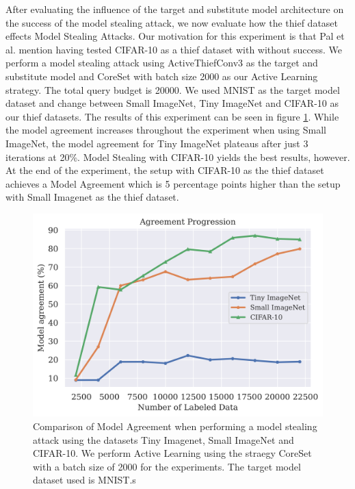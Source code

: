After evaluating the influence of the target and substitute model architecture on the success of the model stealing attack, we now evaluate how the thief dataset effects Model Stealing Attacks. Our motivation for this experiment is that Pal et al. 
mention having tested CIFAR-10 as a thief dataset with without success. We perform a model stealing attack using ActiveThiefConv3 as the target and substitute model and CoreSet with batch size 2000 as our Active Learning strategy. The total query budget
is 20000. We used MNIST as the target model dataset and change between Small ImageNet, Tiny ImageNet and CIFAR-10 as our thief datasets. The results of this experiment can be seen in figure \ref{fig:Evaluation:Results:CAL:EffectDataset}. While the model agreement 
increases throughout the experiment when using Small ImageNet, the model agreement for Tiny ImageNet plateaus after just 3 iterations at 20\%. Model Stealing with CIFAR-10 yields the best results, however. At the end of the experiment, the setup with CIFAR-10 as 
the thief dataset achieves a Model Agreement which is 5 percentage points higher than the setup with Small Imagenet as the thief dataset. \par

\begin{figure}[h]
    \centering
    \includegraphics[width=0.8\linewidth]{images/results_CALMS/effect_dataset.png}
    \caption[Effect of Thief Dataset choice on the success of Model Stealing Attacks]{Comparison of Model Agreement when performing a model stealing attack using the datasets Tiny Imagenet, Small ImageNet and CIFAR-10. We perform Active Learning using the 
    straegy CoreSet with a batch size of 2000 for the experiments. The target model dataset used is MNIST.s}
    \label{fig:Evaluation:Results:CAL:EffectDataset}
\end{figure}


